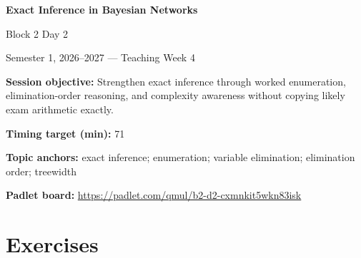 \documentclass[11pt]{article}
\begin{document}
\begin{center}\LARGE\bfseries Exact Inference in Bayesian Networks\end{center}

\begin{center}\large Block 2 Day 2\end{center}

\begin{center}Semester 1, 2026--2027 --- Teaching Week 4\end{center}

\begin{tcolorbox}[colback=MidnightBlue!4,colframe=MidnightBlue,title={Session Overview},fonttitle=\bfseries,breakable]
\textbf{Session objective:} Strengthen exact inference through worked enumeration, elimination-order reasoning, and complexity awareness without copying likely exam arithmetic exactly.

\textbf{Timing target (min):} 71

\textbf{Topic anchors:} exact inference; enumeration; variable elimination; elimination order; treewidth

\textbf{Padlet board:} \url{https://padlet.com/qmul/b2-d2-cxmnkit5wkn83isk}
\end{tcolorbox}

\section*{Exercises}
\end{document}
